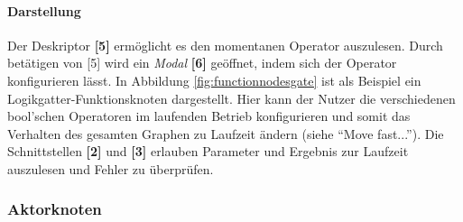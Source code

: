\paragraph{Darstellung}  Der Deskriptor \textbf{[5]} ermöglicht es den momentanen Operator auszulesen. Durch betätigen von [5] wird ein \textit{Modal} \textbf{[6]} geöffnet, indem sich der Operator konfigurieren lässt. In Abbildung \ref{fig:functionnodesgate} ist als Beispiel ein Logikgatter-Funktionsknoten dargestellt. Hier kann der Nutzer die verschiedenen bool'schen Operatoren im laufenden Betrieb konfigurieren und somit das Verhalten des gesamten Graphen zu Laufzeit ändern (siehe "`Move fast..."'). Die Schnittstellen \textbf{[2]} und \textbf{[3]} erlauben Parameter und Ergebnis zur Laufzeit auszulesen und Fehler zu überprüfen.


\subsubsection{Aktorknoten}

